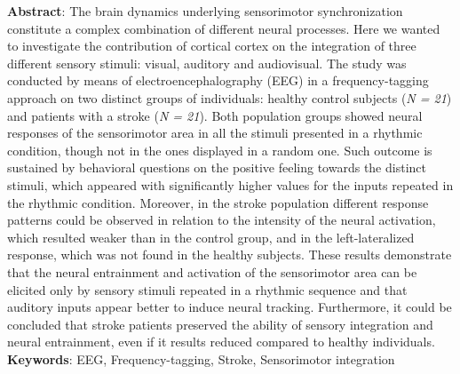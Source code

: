 \documentclass[a4paper, twoside, openright]{book}
\begin{document}


\cleardoublepage
\newpage 
\thispagestyle{empty}
\begin{flushleft}
  \vspace*{15em}
  \justify
  \textbf{Abstract}: The brain dynamics underlying sensorimotor synchronization constitute a complex combination of different neural processes. Here we wanted to investigate the contribution of cortical cortex on the integration of three different sensory stimuli: visual, auditory and audiovisual. The study was conducted by means of electroencephalography (EEG) in a frequency-tagging approach on two distinct groups of individuals: healthy control subjects (\textit{N = 21}) and patients with a stroke (\textit{N = 21}). Both population groups showed neural responses of the sensorimotor area in all the stimuli presented in a rhythmic condition, though not in the ones displayed in a random one. Such outcome is sustained by behavioral questions on the positive feeling towards the distinct stimuli, which appeared with significantly higher values for the inputs repeated in the rhythmic condition. Moreover, in the stroke population different response patterns could be observed in relation to the intensity of the neural activation, which resulted weaker than in the control group, and in the left-lateralized response, which was not found in the healthy subjects. These results demonstrate that the neural entrainment and activation of the sensorimotor area can be elicited only by sensory stimuli repeated in a rhythmic sequence and that auditory inputs appear better to induce neural tracking. Furthermore, it could be concluded that stroke patients preserved the ability of sensory integration and neural entrainment, even if it results reduced compared to healthy individuals. 
  \vspace*{3em}
  \justify
  \textbf{Keywords}: EEG, Frequency-tagging, Stroke, Sensorimotor integration
\end{flushleft}

\tableofcontents













\begin{appendices}

\end{appendices}

\printbibliography[heading=bibintoc]
\end{document}
